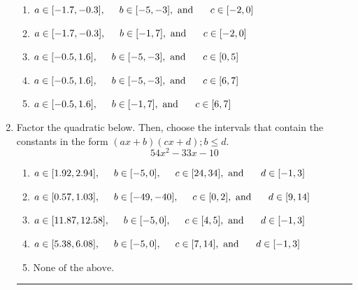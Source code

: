 \documentclass[14pt]{extbook}
\newcommand{\litem}[1]{\item#1\hspace*{-1cm}\rule{\textwidth}{0.4pt}}
\begin{document}
\begin{enumerate}
{\begin{center}
\end{center}
\begin{enumerate}[label=\Alph*.]
\item \( a \in [-1.7, -0.3], \hspace*{5mm} b \in [-5, -3], \text{ and } \hspace*{5mm} c \in [-2, 0] \)
\item \( a \in [-1.7, -0.3], \hspace*{5mm} b \in [-1, 7], \text{ and } \hspace*{5mm} c \in [-2, 0] \)
\item \( a \in [-0.5, 1.6], \hspace*{5mm} b \in [-5, -3], \text{ and } \hspace*{5mm} c \in [0, 5] \)
\item \( a \in [-0.5, 1.6], \hspace*{5mm} b \in [-5, -3], \text{ and } \hspace*{5mm} c \in [6, 7] \)
\item \( a \in [-0.5, 1.6], \hspace*{5mm} b \in [-1, 7], \text{ and } \hspace*{5mm} c \in [6, 7] \)

\end{enumerate} }
\litem{
Factor the quadratic below. Then, choose the intervals that contain the constants in the form $(ax+b)(cx+d); b \leq d.$\[ 54x^{2} -33 x -10 \]\begin{enumerate}[label=\Alph*.]
\item \( a \in [1.92, 2.94], \hspace*{5mm} b \in [-5, 0], \hspace*{5mm} c \in [24, 34], \text{ and } \hspace*{5mm} d \in [-1, 3] \)
\item \( a \in [0.57, 1.03], \hspace*{5mm} b \in [-49, -40], \hspace*{5mm} c \in [0, 2], \text{ and } \hspace*{5mm} d \in [9, 14] \)
\item \( a \in [11.87, 12.58], \hspace*{5mm} b \in [-5, 0], \hspace*{5mm} c \in [4, 5], \text{ and } \hspace*{5mm} d \in [-1, 3] \)
\item \( a \in [5.38, 6.08], \hspace*{5mm} b \in [-5, 0], \hspace*{5mm} c \in [7, 14], \text{ and } \hspace*{5mm} d \in [-1, 3] \)
\item \( \text{None of the above.} \)


\end{enumerate}}
\end{enumerate}
\end{document}
